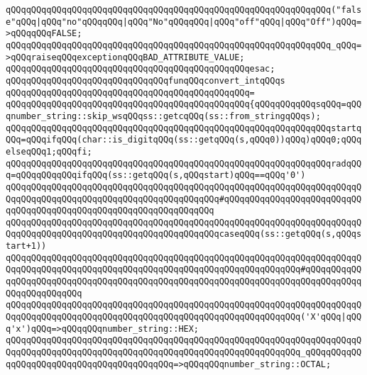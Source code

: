 \verb|qQQqqQQqqQQqqQQqqQQqqQQqqQQqqQQqqQQqqQQqqQQqqQQqqQQqqQQqqQQqqQQq("false"qQQq|\verb#|qQQq"no"qQQqqQQq|qQQq"No"qQQqqQQq|qQQq"off"qQQq|qQQq"Off")qQQq=>qQQqqQQqFALSE;#\newline
\verb|qQQqqQQqqQQqqQQqqQQqqQQqqQQqqQQqqQQqqQQqqQQqqQQqqQQqqQQqqQQqqQQq_qQQq=>qQQqraiseqQQqexceptionqQQqBAD_ATTRIBUTE_VALUE;|\newline
\verb|qQQqqQQqqQQqqQQqqQQqqQQqqQQqqQQqqQQqqQQqqQQqqQQqesac;|\newline
\newline
\verb|qQQqqQQqqQQqqQQqqQQqqQQqqQQqqQQqfunqQQqconvert_intqQQqs|\newline
\verb|qQQqqQQqqQQqqQQqqQQqqQQqqQQqqQQqqQQqqQQqqQQqqQQq=|\newline
\verb|qQQqqQQqqQQqqQQqqQQqqQQqqQQqqQQqqQQqqQQqqQQqqQQq{qQQqqQQqqQQqsqQQq=qQQqnumber_string::skip_wsqQQqss::getcqQQq(ss::from_stringqQQqs);|\newline
\verb|qQQqqQQqqQQqqQQqqQQqqQQqqQQqqQQqqQQqqQQqqQQqqQQqqQQqqQQqqQQqqQQqstartqQQq=qQQqifqQQq(char::is_digitqQQq(ss::getqQQq(s,qQQq0))qQQq)qQQq0;qQQqelseqQQq1;qQQqfi;|\newline
\newline
\verb|qQQqqQQqqQQqqQQqqQQqqQQqqQQqqQQqqQQqqQQqqQQqqQQqqQQqqQQqqQQqqQQqradqQQq=qQQqqQQqqQQqifqQQq(ss::getqQQq(s,qQQqstart)qQQq==qQQq'0')|\newline
\verb|qQQqqQQqqQQqqQQqqQQqqQQqqQQqqQQqqQQqqQQqqQQqqQQqqQQqqQQqqQQqqQQqqQQqqQQqqQQqqQQqqQQqqQQqqQQqqQQqqQQqqQQqqQQqqQQq#qQQqqQQqqQQqqQQqqQQqqQQqqQQqqQQqqQQqqQQqqQQqqQQqqQQqqQQqqQQqqQQqqQQq|\newline
\verb|qQQqqQQqqQQqqQQqqQQqqQQqqQQqqQQqqQQqqQQqqQQqqQQqqQQqqQQqqQQqqQQqqQQqqQQqqQQqqQQqqQQqqQQqqQQqqQQqqQQqqQQqqQQqqQQqcaseqQQq(ss::getqQQq(s,qQQqstart+1))|\newline
\verb|qQQqqQQqqQQqqQQqqQQqqQQqqQQqqQQqqQQqqQQqqQQqqQQqqQQqqQQqqQQqqQQqqQQqqQQqqQQqqQQqqQQqqQQqqQQqqQQqqQQqqQQqqQQqqQQqqQQqqQQqqQQqqQQq#qQQqqQQqqQQqqQQqqQQqqQQqqQQqqQQqqQQqqQQqqQQqqQQqqQQqqQQqqQQqqQQqqQQqqQQqqQQqqQQqqQQqqQQqqQQqqQQq|\newline
\verb|qQQqqQQqqQQqqQQqqQQqqQQqqQQqqQQqqQQqqQQqqQQqqQQqqQQqqQQqqQQqqQQqqQQqqQQqqQQqqQQqqQQqqQQqqQQqqQQqqQQqqQQqqQQqqQQqqQQqqQQqqQQqqQQq('X'qQQq|\verb#|qQQq'x')qQQq=>qQQqqQQqnumber_string::HEX;#\newline
\verb|qQQqqQQqqQQqqQQqqQQqqQQqqQQqqQQqqQQqqQQqqQQqqQQqqQQqqQQqqQQqqQQqqQQqqQQqqQQqqQQqqQQqqQQqqQQqqQQqqQQqqQQqqQQqqQQqqQQqqQQqqQQqqQQq_qQQqqQQqqQQqqQQqqQQqqQQqqQQqqQQqqQQqqQQqqQQq=>qQQqqQQqnumber_string::OCTAL;|\newline
